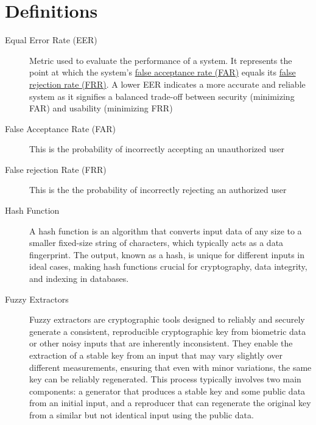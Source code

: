 \section{Definitions}
\begin{description}
    \item[Equal Error Rate (EER)] \label{def:EER} Metric used to evaluate the performance of a system. It represents the point at which the system's \hyperref[def:FAR]{false acceptance rate (FAR)} equals its \hyperref[def:FRR]{false rejection rate (FRR)}. A lower EER indicates a more accurate and reliable system as it signifies a balanced trade-off between security (minimizing FAR) and usability (minimizing FRR)

    \item[False Acceptance Rate (FAR)] \label{def:FAR} This is the probability of incorrectly accepting an unauthorized user

    \item[False rejection Rate (FRR)] \label{def:FRR} This is the the probability of incorrectly rejecting an authorized user

    \item[Hash Function] \label{def:Hash_Function} A hash function is an algorithm that converts input data of any size to a smaller fixed-size string of characters, which typically acts as a data fingerprint. The output, known as a hash, is unique for different inputs in ideal cases, making hash functions crucial for cryptography, data integrity, and indexing in databases.

    \item[Fuzzy Extractors] \label{def:Fuzzy_Extractors} Fuzzy extractors are cryptographic tools designed to reliably and securely generate a consistent, reproducible cryptographic key from biometric data or other noisy inputs that are inherently inconsistent. They enable the extraction of a stable key from an input that may vary slightly over different measurements, ensuring that even with minor variations, the same key can be reliably regenerated. This process typically involves two main components: a generator that produces a stable key and some public data from an initial input, and a reproducer that can regenerate the original key from a similar but not identical input using the public data.
\end{description}
